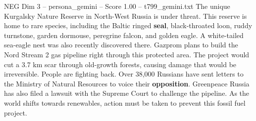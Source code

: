 \begin{textsample}{NEG Dim 3 – persona\_gemini – Score 1.00 – t799\_gemini.txt}  \label{ex:f3_neg_020}
The unique Kurgalsky Nature Reserve in North-West Russia is under threat.
This reserve is home to rare species, including the Baltic ringed \textbf{seal}, black-throated loon, ruddy turnstone, garden dormouse, peregrine falcon, and golden eagle.
A white-tailed sea-eagle nest was also recently discovered there.
Gazprom plans to build the Nord Stream 2 gas pipeline right through this protected area.
The project would cut a 3.7 km scar through old-growth forests, causing damage that would be irreversible.
People are fighting back.
Over 38,000 Russians have sent letters to the Ministry of Natural Resources to voice their \textbf{opposition}.
Greenpeace Russia has also filed a lawsuit with the Supreme Court to challenge the pipeline.
As the world shifts towards renewables, action must be taken to prevent this fossil fuel project.

\end{textsample}

